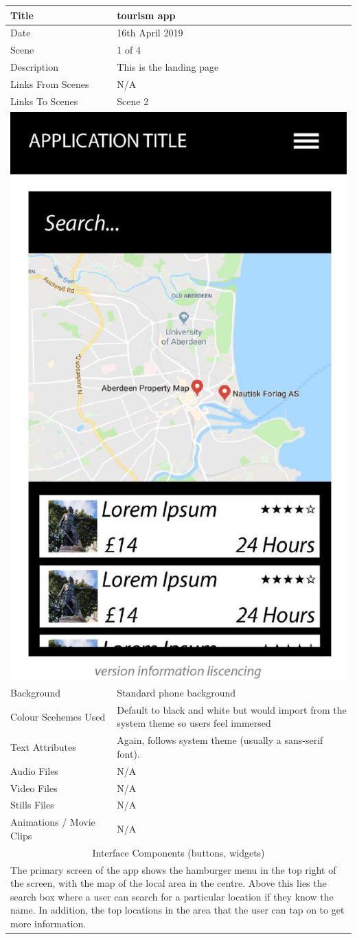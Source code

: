 \hspace{-1cm}
	\begin{tabular}{p{4cm}p{10cm}}
		\hline
		Title & tourism app \\
		\hline
		Date & 16th April 2019 \\
		\hline
		Scene & 1 of 4 \\
		\hline
		Description & This is the landing page \\
		\hline
		Links From Scenes & N/A \\
		\hline
		Links To Scenes & Scene 2 \\
		\hline
		\multicolumn{2}{c}{\includegraphics[width=0.5\linewidth]{images/screen0.jpg}} \\
		\hline
		Background & Standard phone background \\
		\hline
		Colour Scehemes Used & Default to black and white but would import from the system theme so users feel immersed \\
		\hline
		Text Attributes & Again, follows system theme (usually a sans-serif font). \\
		\hline
		Audio Files & N/A \\
		\hline
		Video Files & N/A \\
		\hline
		Stills Files & N/A \\
		\hline
		Animations / Movie Clips & N/A \\
		\hline
		\multicolumn{2}{c}{Interface Components (buttons, widgets)} \\
		\hline
		\multicolumn{2}{p{14cm}}{The primary screen of the app shows the hamburger menu in the top right of the screen, with the map of the local area in the centre. Above this lies the search box where a user can search for a particular location if they know the name. In addition, the top locations in the area that the user can tap on to get more information.} \\
		\hline
	\end{tabular}
